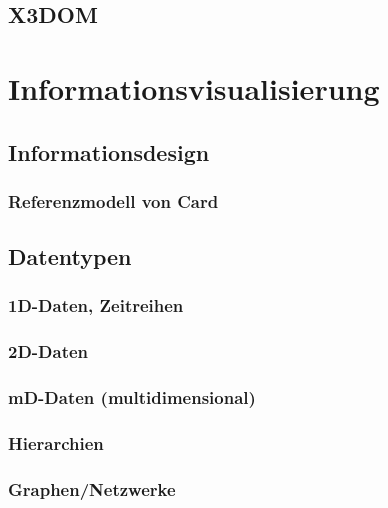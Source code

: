 \documentclass[a4paper, 11pt, accentcolor = tud3b]{tudreport}
\begin{document}
		\section{X3DOM} %

	\chapter{Informationsvisualisierung} %

		\section{Informationsdesign} %

			\subsection{Referenzmodell von Card} %

		\section{Datentypen} %

			\subsection{1D-Daten, Zeitreihen} %

			\subsection{2D-Daten} %

			\subsection{mD-Daten (multidimensional)} %

			\subsection{Hierarchien} %

			\subsection{Graphen/Netzwerke} %
\end{document}

